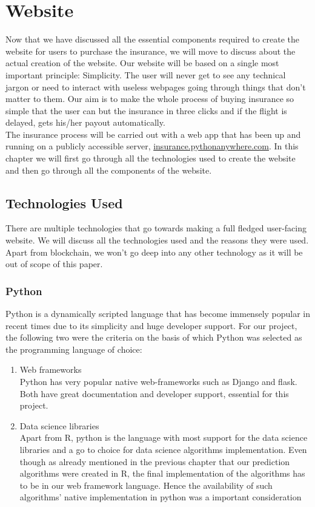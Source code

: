 \chapter{Website}

Now that we have discussed all the essential components required to create the website for users to purchase the insurance, we will move to discuss about the actual creation of the website. Our website will be based on a single most important principle: Simplicity. The user will never get to see any technical jargon or need to interact with useless webpages going through things that don't matter to them. Our aim is to make the whole process of buying insurance so simple that the user can but the insurance in three clicks and if the flight is delayed, gets his/her payout automatically. 
\\The insurance process will be carried out with a web app that has been up and running on a publicly accessible server, \url{insurance.pythonanywhere.com}. In this chapter we will first go through all the technologies used to create the website and then go through all the components of the website. 

\section{Technologies Used}
There are multiple technologies that go towards making a full fledged user-facing website. We will discuss all the technologies used and the reasons they were used. Apart from blockchain, we won't go deep into any other technology as it will be out of scope of this paper. 

\subsection{Python}
Python is a dynamically scripted language that has become immensely popular in recent times due to its simplicity and huge developer support. For our project, the following two were the criteria on the basis of which Python was selected as the programming language of choice:
\begin{enumerate}
    \item Web frameworks
    \\Python has very popular native web-frameworks such as Django and flask. Both have great documentation and developer support, essential for this project. 
    \item Data science libraries
    \\ Apart from R, python is the language with most support for the data science libraries and a go to choice for data science algorithms implementation. Even though as already mentioned in the previous chapter that our prediction algorithms were created in R, the final implementation of the algorithms has to be in our web framework language. Hence the availability of such algorithms' native implementation in python was a important consideration
\end{enumerate}

